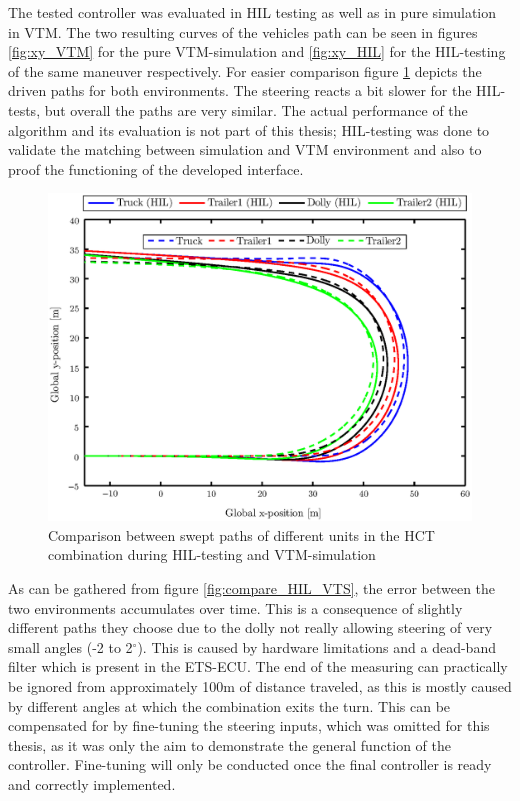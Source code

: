 \documentclass[ExampleMasters.tex]{subfiles}
\begin{document}
The tested controller was evaluated in \gls{HIL} testing as well as in pure simulation in \gls{VTM}. The two resulting curves of the vehicles path can be seen in figures \ref{fig:xy_VTM} for the pure \gls{VTM}-simulation and \ref{fig:xy_HIL} for the \gls{HIL}-testing of the same maneuver respectively. For easier comparison figure \ref{fig:xy_HIL_and_VTM} depicts the driven paths for both environments. The steering reacts a bit slower for the \gls{HIL}-tests, but overall the paths are very similar. The actual performance of the algorithm and its evaluation is not part of this thesis; \gls{HIL}-testing was done to validate the matching between simulation and \gls{VTM} environment and also to proof the functioning of the developed interface.


\begin{figure}[!htb]
	\centering
	\includegraphics[width=1\linewidth]{figures/xy_HIL_and_VTM}

	\caption{Comparison between swept paths of different units in the \acrshort{HCT} combination during \acrlong{HIL}-testing and \acrshort{VTM}-simulation}
	
	\label{fig:xy_HIL_and_VTM}
\end{figure}

As can be gathered from figure \ref{fig:compare_HIL_VTS}, the error between the two environments accumulates over time. This is a consequence of slightly different paths they choose due to the dolly not really allowing steering of very small angles (-2 to 2$^\circ$). This is caused by hardware limitations and a dead-band filter which is present in the \gls{ETS}-\gls{ECU}. The end of the measuring can practically be ignored from approximately 100m of distance traveled, as this is mostly caused by different angles at which the combination exits the turn. This can be compensated for by fine-tuning the steering inputs, which was omitted for this thesis, as it was only the aim to demonstrate the general function of the controller. Fine-tuning will only be conducted once the final controller is ready and correctly implemented. 
\end{document}
